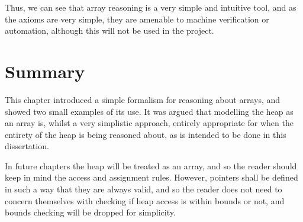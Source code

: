 Thus, we can see that array reasoning is a very simple and intuitive
tool, and as the axioms are very simple, they are amenable to machine
verification or automation, although this will not be used in the project.

\section{Summary}
\label{sec:heap-summary}

This chapter introduced a simple formalism for reasoning about arrays,
and showed two small examples of its use. It was argued that modelling
the heap as an array is, whilst a very simplistic approach, entirely
appropriate for when the entirety of the heap is being reasoned about,
as is intended to be done in this dissertation.

In future chapters the heap will be treated as an array, and so the
reader should keep in mind the access and assignment rules. However,
pointers shall be defined in such a way that they are always valid,
and so the reader does not need to concern themselves with checking if
heap access is within bounds or not, and bounds checking will be
dropped for simplicity.
